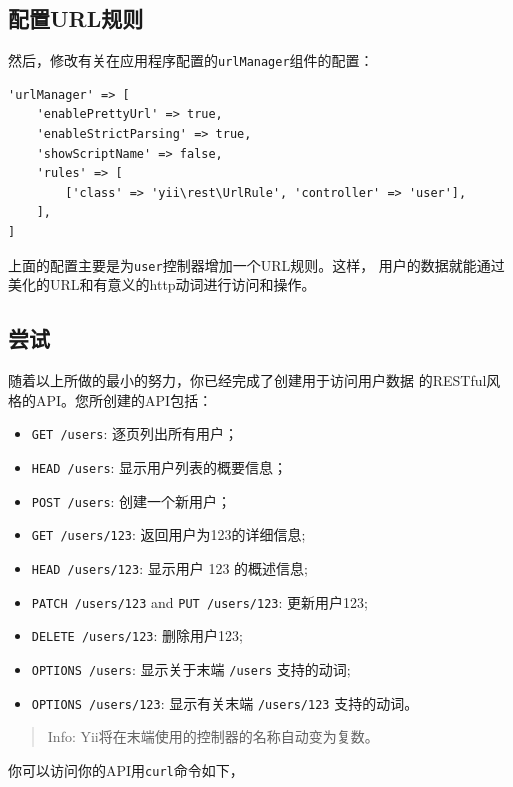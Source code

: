 \subsection{配置URL规则 \label{rest-quick-start.md::configuring-url-rules}}
然后，修改有关在应用程序配置的\lstinline|urlManager|组件的配置：

\lstset{language=php}\begin{lstlisting}
'urlManager' => [
    'enablePrettyUrl' => true,
    'enableStrictParsing' => true,
    'showScriptName' => false,
    'rules' => [
        ['class' => 'yii\rest\UrlRule', 'controller' => 'user'],
    ],
]
\end{lstlisting}
上面的配置主要是为\lstinline|user|控制器增加一个URL规则。这样，
用户的数据就能通过美化的URL和有意义的http动词进行访问和操作。

\subsection{尝试 \label{rest-quick-start.md::trying-it-out}}
随着以上所做的最小的努力，你已经完成了创建用于访问用户数据
的RESTful风格的API。您所创建的API包括：

\begin{itemize}
\item \lstinline|GET /users|: 逐页列出所有用户；
\item \lstinline|HEAD /users|: 显示用户列表的概要信息；
\item \lstinline|POST /users|: 创建一个新用户；
\item \lstinline|GET /users/123|: 返回用户为123的详细信息;
\item \lstinline|HEAD /users/123|: 显示用户 123 的概述信息;
\item \lstinline|PATCH /users/123| and \lstinline|PUT /users/123|: 更新用户123;
\item \lstinline|DELETE /users/123|: 删除用户123;
\item \lstinline|OPTIONS /users|: 显示关于末端 \lstinline|/users| 支持的动词;
\item \lstinline|OPTIONS /users/123|: 显示有关末端 \lstinline|/users/123| 支持的动词。
\end{itemize}
\begin{quote}Info: Yii将在末端使用的控制器的名称自动变为复数。

\end{quote}
你可以访问你的API用\lstinline|curl|命令如下，

